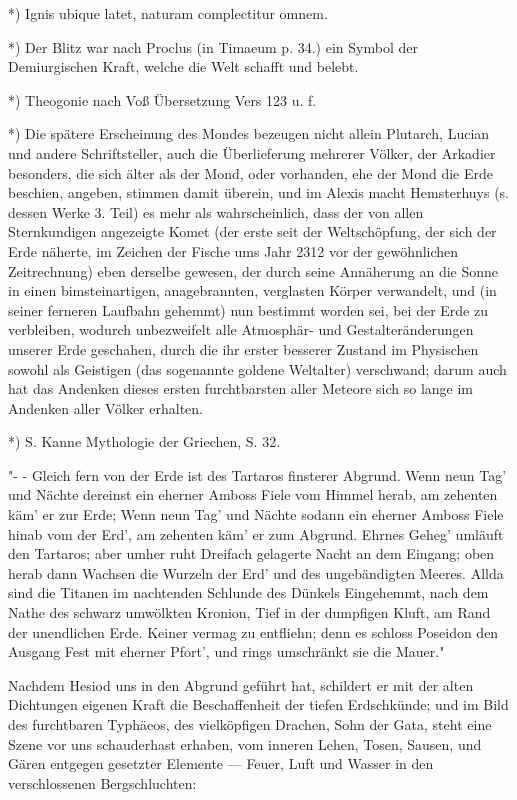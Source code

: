 \documentclass[a4paper, 11pt, oneside, polutonikogreek, german]{article}
\begin{document}
*) Ignis ubique latet, naturam complectitur omnem.

*) Der Blitz war nach Proclus (in Timaeum p. 34.) ein Symbol der Demiurgischen Kraft, welche die Welt schafft und belebt.

*) Theogonie nach Voß Übersetzung Vers 123 u. f.

*) Die spätere Erscheinung des Mondes bezeugen nicht allein Plutarch, Lucian und andere Schriftsteller, auch die Überlieferung mehrerer Völker, der Arkadier besonders, die sich älter als der Mond, oder vorhanden, ehe der Mond die Erde beschien, angeben, stimmen damit überein, und im Alexis macht Hemsterhuys (s. dessen Werke 3. Teil) es mehr als wahrscheinlich, dass der von allen Sternkundigen angezeigte Komet (der erste seit der Weltschöpfung, der sich der Erde näherte, im Zeichen der Fische ums Jahr 2312 vor der gewöhnlichen Zeitrechnung) eben derselbe gewesen, der durch seine Annäherung an die Sonne in einen bimsteinartigen, anagebrannten, verglasten Körper verwandelt, und (in seiner ferneren Laufbahn gehemmt) nun bestimmt worden sei, bei der Erde zu verbleiben, wodurch unbezweifelt alle Atmosphär- und Gestalteränderungen unserer Erde geschahen, durch die ihr erster besserer Zustand im Physischen sowohl als Geistigen (das sogenannte goldene Weltalter) verschwand; darum auch hat das Andenken dieses ersten furchtbarsten aller Meteore sich so lange im Andenken aller Völker erhalten.

*) S. Kanne Mythologie der Griechen, S. 32.

"- - Gleich fern von der Erde ist des Tartaros finsterer Abgrund. Wenn neun Tag' und Nächte dereinst ein eherner Amboss Fiele vom Himmel herab, am zehenten käm' er zur Erde; Wenn neun Tag' und Nächte sodann ein eherner Amboss Fiele hinab vom der Erd', am zehenten käm' er zum Abgrund. Ehrnes Geheg' umläuft den Tartaros; aber umher ruht Dreifach gelagerte Nacht an dem Eingang; oben herab dann Wachsen die Wurzeln der Erd' und des ungebändigten Meeres. Allda sind die Titanen im nachtenden Schlunde des Dünkels Eingehemmt, nach dem Nathe des schwarz umwölkten Kronion, Tief in der dumpfigen Kluft, am Rand der unendlichen Erde. Keiner vermag zu entfliehn; denn es schloss Poseidon den Ausgang Fest mit eherner Pfort', und rings umschränkt sie die Mauer."

Nachdem Hesiod uns in den Abgrund geführt hat, schildert er mit der alten Dichtungen eigenen Kraft die Beschaffenheit der tiefen Erdschkünde; und im Bild des furchtbaren Typhäeos, des vielköpfigen Drachen, Sohn der Gata, steht eine Szene vor uns schauderhast erhaben, vom inneren Lehen, Tosen, Sausen, und Gären entgegen gesetzter Elemente --- Feuer, Luft und Wasser in den verschlossenen Bergschluchten:
\end{document}
